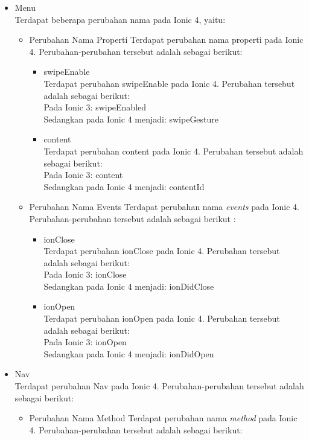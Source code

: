 \begin{enumerate}
\begin{enumerate}
\begin{itemize}
\begin{itemize}
				\item Menu \\
				Terdapat beberapa perubahan nama pada Ionic 4, yaitu:
				\begin{itemize}
					\item Perubahan Nama Properti
					Terdapat perubahan nama properti pada Ionic 4. Perubahan-perubahan tersebut adalah sebagai berikut: 
						\begin{itemize}
							\item swipeEnable \\
							Terdapat perubahan swipeEnable pada Ionic 4. Perubahan tersebut adalah sebagai berikut: \\
							Pada Ionic 3: swipeEnabled \\
							Sedangkan pada Ionic 4 menjadi: swipeGesture						
							\newpage
							\item content \\
							Terdapat perubahan content pada Ionic 4. Perubahan tersebut adalah sebagai berikut: \\
							Pada Ionic 3: content \\
							Sedangkan pada Ionic 4 menjadi: contentId
						\end{itemize}	
					

					\item Perubahan Nama Events
					Terdapat perubahan nama {\it events} pada Ionic 4. Perubahan-perubahan tersebut adalah sebagai berikut :
						\begin{itemize}
							\item ionClose \\
							Terdapat perubahan ionClose pada Ionic 4. Perubahan tersebut adalah sebagai berikut: \\
							Pada Ionic 3: ionClose \\
							Sedangkan pada Ionic 4 menjadi: ionDidClose

							\item ionOpen \\
							Terdapat perubahan ionOpen pada Ionic 4. Perubahan tersebut adalah sebagai berikut: \\
							Pada Ionic 3: ionOpen \\
							Sedangkan pada Ionic 4 menjadi: ionDidOpen
						\end{itemize}	
				\end{itemize}

				\item Nav \\
				Terdapat perubahan Nav pada Ionic 4. Perubahan-perubahan tersebut adalah sebagai berikut:
				\begin{itemize}
					\item Perubahan Nama Method 
					Terdapat perubahan nama {\it method} pada Ionic 4. Perubahan-perubahan tersebut adalah sebagai berikut:
					\begin{itemize}				
					

\end{itemize}
\end{itemize}
\end{itemize}
\end{itemize}
\end{enumerate}
\end{enumerate}
